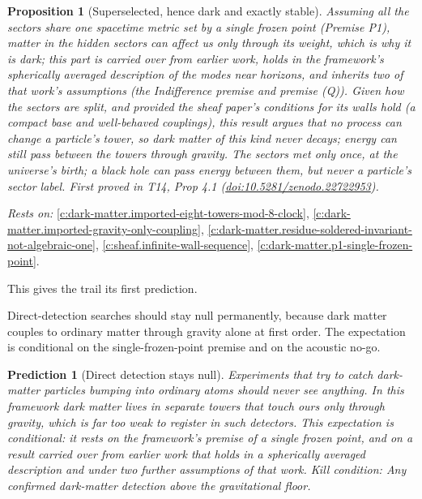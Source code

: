 \documentclass[11pt]{article}
\newtheorem{proposition}[theorem]{Proposition}
\newtheorem{prediction}[theorem]{Prediction}
\theoremstyle{definition}
\theoremstyle{plain}
\begin{document}
\begin{proposition}[Superselected, hence dark and exactly stable]\label{c:dark-matter.superselected-hence-dark-exactly-stable}
Assuming all the sectors share one spacetime metric set by a single frozen point (Premise P1), matter in the hidden sectors can affect us only through its weight, which is why it is dark; this part is carried over from earlier work, holds in the framework's spherically averaged description of the modes near horizons, and inherits two of that work's assumptions (the Indifference premise and premise (Q)). Given how the sectors are split, and provided the sheaf paper's conditions for its walls hold (a compact base and well-behaved couplings), this result argues that no process can change a particle's tower, so dark matter of this kind never decays; energy can still pass between the towers through gravity. The sectors met only once, at the universe's birth; a black hole can pass energy between them, but never a particle's sector label.
\emph{First proved in} T14, Prop 4.1 (\href{https://doi.org/10.5281/zenodo.22722953}{doi:10.5281/zenodo.22722953}).
\end{proposition}
\noindent\emph{Rests on:} \ref{c:dark-matter.imported-eight-towers-mod-8-clock}, \ref{c:dark-matter.imported-gravity-only-coupling}, \ref{c:dark-matter.residue-soldered-invariant-not-algebraic-one}, \ref{c:sheaf.infinite-wall-sequence}, \ref{c:dark-matter.p1-single-frozen-point}.

This gives the trail its first prediction.

Direct-detection searches should stay null permanently, because dark matter couples to ordinary matter through gravity alone at first order. The expectation is conditional on the single-frozen-point premise and on the acoustic no-go.

\begin{prediction}[Direct detection stays null]\label{c:pred.dark-matter-direct-detection-null}
Experiments that try to catch dark-matter particles bumping into ordinary atoms should never see anything. In this framework dark matter lives in separate towers that touch ours only through gravity, which is far too weak to register in such detectors. This expectation is conditional: it rests on the framework's premise of a single frozen point, and on a result carried over from earlier work that holds in a spherically averaged description and under two further assumptions of that work.
\emph{Kill condition:} Any confirmed dark-matter detection above the gravitational floor.
\end{prediction}
\end{document}
